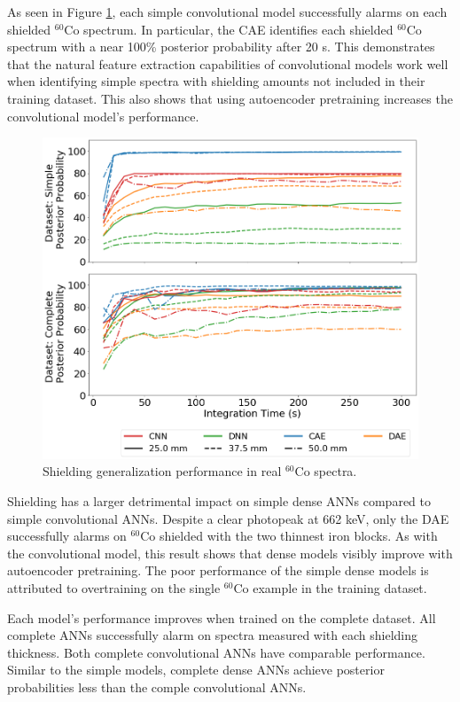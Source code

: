As seen in Figure \ref{fig:iron_co60}, each simple convolutional model successfully alarms on each shielded  $^{60}$Co spectrum. In particular, the CAE identifies each shielded $^{60}$Co spectrum with a near 100\% posterior probability after 20 s. This demonstrates that the natural feature extraction capabilities of convolutional models work well when identifying simple spectra with shielding amounts not included in their training dataset. This also shows that using autoencoder pretraining increases the convolutional model's performance.

\begin{figure}[H]
	\centering
	\includegraphics[width=0.8\linewidth]{images/iron_co60}	\caption{Shielding generalization performance in real $^{60}$Co spectra.}
	\label{fig:iron_co60}
\end{figure}

Shielding has a larger detrimental impact on simple dense ANNs compared to simple convolutional ANNs. Despite a clear photopeak at 662 keV, only the DAE successfully alarms on $^{60}$Co shielded with the two thinnest iron blocks. As with the convolutional model, this result shows that dense models visibly improve with autoencoder pretraining. The poor performance of the simple dense models is attributed to overtraining on the single $^{60}$Co example in the training dataset. 

Each model's performance improves when trained on the complete dataset. All complete ANNs successfully alarm on spectra measured with each shielding thickness. Both complete convolutional ANNs have comparable performance. Similar to the simple models, complete dense ANNs achieve posterior probabilities less than the comple convolutional ANNs.

